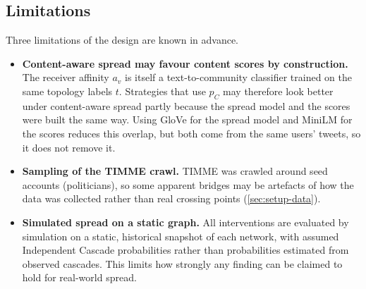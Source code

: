 \subsection{Limitations}
\label{sec:method-limits}
Three limitations of the design are known in advance.
\begin{itemize}
  \item \textbf{Content-aware spread may favour content scores by construction.} The
        receiver affinity $a_v$ is itself a text-to-community classifier trained on
        the same topology labels $t$. Strategies that use $p_C$ may therefore look
        better under content-aware spread partly because the spread model and the
        scores were built the same way. Using GloVe for the spread model and MiniLM
        for the scores reduces this overlap, but both come from the same users'
        tweets, so it does not remove it.
  \item \textbf{Sampling of the TIMME crawl.} TIMME was crawled around seed accounts
        (politicians), so some apparent bridges may be artefacts of how the data was
        collected rather than real crossing points (\cref{sec:setup-data}).
  \item \textbf{Simulated spread on a static graph.} All interventions are evaluated
        by simulation on a static, historical snapshot of each network, with assumed
        Independent Cascade probabilities rather than probabilities estimated from
        observed cascades. This limits how strongly any finding can be claimed to hold
        for real-world spread.
\end{itemize}
